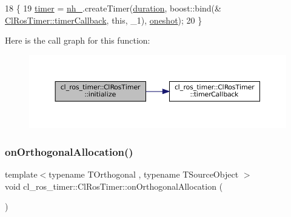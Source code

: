 \begin{DoxyCode}
18 \{
19     \hyperlink{classcl__ros__timer_1_1ClRosTimer_a50237ecbf49b178b9d109b25ba768f5a}{timer} = \hyperlink{classcl__ros__timer_1_1ClRosTimer_a37b156a2fc18f04891aa4cb63c8d41b9}{nh\_}.createTimer(\hyperlink{classcl__ros__timer_1_1ClRosTimer_a39a5666044409eca94562fcceca8b0ea}{duration}, boost::bind(&
      \hyperlink{classcl__ros__timer_1_1ClRosTimer_a047720c2f37e354e0867b148c85e18e3}{ClRosTimer::timerCallback}, \textcolor{keyword}{this}, \_1), \hyperlink{classcl__ros__timer_1_1ClRosTimer_a07ce4ac2560aa7ad4b5dee233f2d7733}{oneshot});
20 \}
\end{DoxyCode}
Here is the call graph for this function\+:
\nopagebreak
\begin{figure}[H]
\begin{center}
\leavevmode
\includegraphics[width=350pt]{classcl__ros__timer_1_1ClRosTimer_a874e97a9e3e974966ac4999e0a293e73_cgraph}
\end{center}
\end{figure}
\mbox{\label{classcl__ros__timer_1_1ClRosTimer_a750d57fbbdb9db5a2382ee6180fd7700}} 
\subsubsection{\texorpdfstring{on\+Orthogonal\+Allocation()}{onOrthogonalAllocation()}}
{\footnotesize\ttfamily template$<$typename T\+Orthogonal , typename T\+Source\+Object $>$ \\
void cl\+\_\+ros\+\_\+timer\+::\+Cl\+Ros\+Timer\+::on\+Orthogonal\+Allocation (\begin{DoxyParamCaption}{ }\end{DoxyParamCaption})\hspace{0.3cm}{\ttfamily [inline]}}



